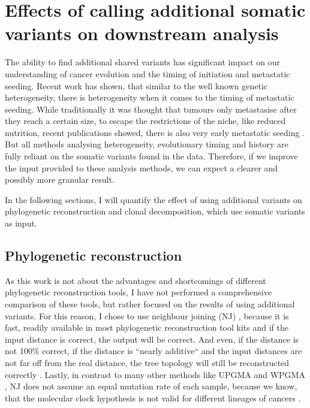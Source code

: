 \section[Effects on downstream analysis]{Effects of calling additional somatic variants on downstream analysis}
\label{variantcalling-sec:downstream}

The ability to find additional shared variants has significant impact on our understanding of cancer evolution and the timing of initiation and metastatic seeding. Recent work has shown, that similar to the well known genetic heterogeneity, there is heterogeneity when it comes to the timing of metastatic seeding. While traditionally it was thought that tumours only metastasise after they reach a certain size, to escape the restrictions of the niche, like reduced nutrition, recent publications showed, there is also very early metastatic seeding \cite{Hu2019}. 
But all methods analysing heterogeneity, evolutionary timing and history are fully reliant on the somatic variants found in the data. Therefore, if we improve the input provided to these analysis methods, we can expect a clearer and possibly more granular result.

In the following sections, I will quantify the effect of using additional variants on  phylogenetic reconstruction and clonal decomposition, which use somatic variants as input.


\subsection[Phylogenetic reconstruction]{Phylogenetic reconstruction}
\label{variantcalling-sec:phylo}
As this work is not about the advantages and shortcomings of different phylogenetic reconstruction tools, I have not performed a comprehensive comparison of these tools, but rather focused on the results of using additional variants.  For this reason, I chose to use neighbour joining (NJ) \cite{Saitou1987}, because it is fast, readily available in most phylogenetic reconstruction tool kits and if the input distance is correct, the output will be correct. And even, if the distance is not 100\% correct, if the distance is ``nearly additive`` and the input distances are not far off from the real distance, the tree topology will still be reconstructed correctly \cite{Mihaescu2007}. Lastly, in contrast to many other methods like UPGMA and WPGMA \cite{Sokal1958}, NJ does not assume an equal mutation rate of each sample, because we know, that the molecular clock hypothesis \cite{Zuckerkandl1962} is not valid for different lineages of cancers \cite{Shibata2010}.


